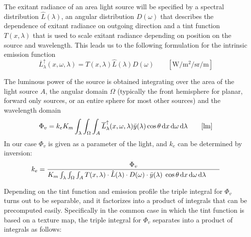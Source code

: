 The exitant radiance of an area light source will be specified by a spectral
distribution $\hat{L}(\lambda)$, an angular distribution $D(\omega)$ that
describes the dependence of exitant radiance on outgoing direction and a tint
function $T(x,\lambda)$ that is used to scale exitant radiance depending on
position on the source and wavelength. This leads us to the following
formulation for the intrinsic emission function
\begin{equation}
\overline{L}^\uparrow_{\lambda}(x, \omega, \lambda) = T(x, \lambda)
\hat{L}(\lambda) D(\omega)
\qquad \left[\si{\watt\per\square\meter\per\steradian\per\meter}\right]
\end{equation}

The luminous power of the source is obtained integrating over the area of the
light source $A$, the angular domain $\Omega$ (typically the front hemisphere
for planar, forward only sources, or an entire sphere for most other sources)
and the wavelength domain
\begin{equation}
\Phi_v = k_e K_m \int_\lambda \int_\Omega \int_A
\overline{L}^\uparrow_{\lambda}(x, \omega, \lambda) \bar y (\lambda) \cos\theta
\d x \d\omega \d\lambda
\qquad [\si{\lumen}]
\end{equation}
In our case $\Phi_v$ is given as a parameter of the light, and $k_e$ can be
determined by inversion:
\begin{equation}
k_e = \frac{\Phi_v}{K_m \int_\lambda \int_\Omega \int_A T(x, \lambda) \cdot
\hat{L}(\lambda) \cdot D(\omega) \cdot \bar y (\lambda) \; \cos\theta \mathop{}\!\mathrm{d} x \mathop{}\!\mathrm{d}\omega
\mathop{}\!\mathrm{d}\lambda \qquad}
\end{equation}

Depending on the tint function and emission profile the triple integral for
$\Phi_v$ turns out to be separable, and it factorizes into a product of
integrals that can be precomputed easily.
Specifically in the common case in which the tint function is based on a texture
map, the triple integral for $\Phi_v$ separates into a product of integrals as
follows:

